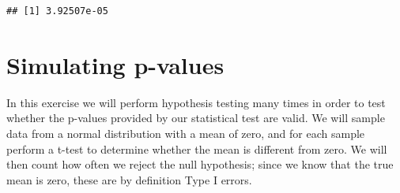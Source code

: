 \documentclass[
  12pt,
]{book}
\newenvironment{Shaded}{\begin{snugshade}}{\end{snugshade}}
\newcommand{\AttributeTok}[1]{\textcolor[rgb]{0.13,0.29,0.53}{#1}}
\newcommand{\CommentTok}[1]{\textcolor[rgb]{0.56,0.35,0.01}{\textit{#1}}}
\newcommand{\ControlFlowTok}[1]{\textcolor[rgb]{0.13,0.29,0.53}{\textbf{#1}}}
\newcommand{\DecValTok}[1]{\textcolor[rgb]{0.00,0.00,0.81}{#1}}
\newcommand{\FunctionTok}[1]{\textcolor[rgb]{0.13,0.29,0.53}{\textbf{#1}}}
\newcommand{\NormalTok}[1]{#1}
\newcommand{\OtherTok}[1]{\textcolor[rgb]{0.56,0.35,0.01}{#1}}
\newcommand{\SpecialCharTok}[1]{\textcolor[rgb]{0.81,0.36,0.00}{\textbf{#1}}}
\begin{document}
\begin{verbatim}
## [1] 3.92507e-05
\end{verbatim}

\hypertarget{simulating-p-values}{%
\section{Simulating p-values}\label{simulating-p-values}}

In this exercise we will perform hypothesis testing many times in order to test whether the p-values provided by our statistical test are valid. We will sample data from a normal distribution with a mean of zero, and for each sample perform a t-test to determine whether the mean is different from zero. We will then count how often we reject the null hypothesis; since we know that the true mean is zero, these are by definition Type I errors.

\begin{Shaded}
\end{Shaded}
\end{document}

